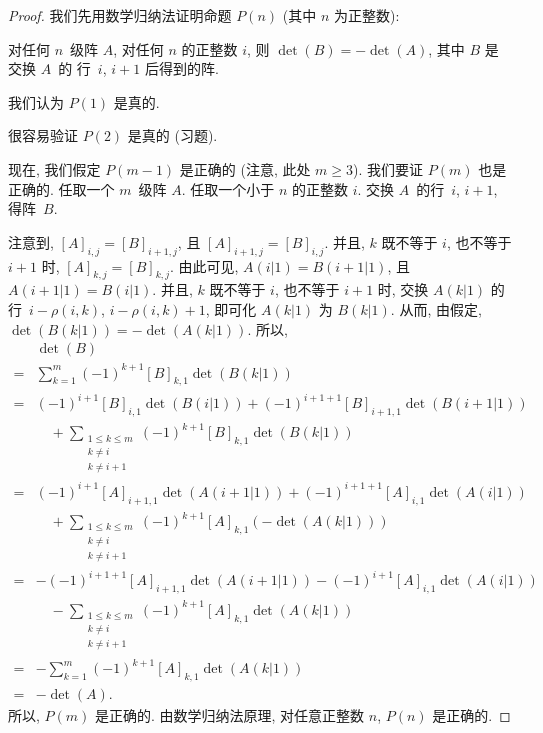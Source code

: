 \documentclass[%
    UTF8,%
    fontset=none,%
    punct=kaiming,%
    zihao=-4,%
    a4paper,%
    oneside,%
]{ctexbook}
\makeatletter
\let\emph\relax
\renewcommand*{\leq}{\leqslant}
\renewcommand*{\geq}{\geqslant}
\renewenvironment{quotation}
{\list{}{\listparindent 2\ccwd%
\itemindent\listparindent
\leftmargin\rightmargin
\parsep\z@ \@plus\p@}%
\item\relax}
{\endlist}
\makeatother
\begin{document}
\begin{proof}
    我们先用数学归纳法证明命题 \(P(n)\)
    (其中 \(n\) 为正整数):
    \begin{quotation}
        对任何 \(n\)~级阵 \(A\),
        对任何\emph{小于} \(n\) 的正整数 \(i\),
        则 \(\det {(B)} = -\det {(A)}\),
        其中 \(B\) 是交换 \(A\)~的%
        行~\(i\), \(i+1\) 后得到的阵.
    \end{quotation}

    我们认为 \(P(1)\) 是真的.

    很容易验证 \(P(2)\) 是真的 (习题).

    现在, 我们假定 \(P(m-1)\) 是正确的
    (注意, 此处 \(m \geq 3\)).
    我们要证 \(P(m)\) 也是正确的.
    任取一个 \(m\)~级阵 \(A\).
    任取一个小于 \(n\) 的正整数 \(i\).
    交换 \(A\)~的行~\(i\), \(i+1\),
    得阵~\(B\).

    注意到, \([A]_{i,j} = [B]_{i+1,j}\),
    且 \([A]_{i+1,j} = [B]_{i,j}\).
    并且, \(k\) 既不等于 \(i\), 也不等于 \(i+1\) 时,
    \([A]_{k,j} = [B]_{k,j}\).
    由此可见, \(A(i|1) = B({i+1}|1)\),
    且 \(A({i+1}|1) = B(i|1)\).
    并且, \(k\) 既不等于 \(i\), 也不等于 \(i+1\) 时,
    交换 \(A(k|1)\) 的%
    行~\(i - \rho(i,k)\), \(i - \rho(i,k) + 1\),
    即可化 \(A(k|1)\) 为 \(B(k|1)\).
    从而, 由假定,
    \(\det {(B(k|1))} = -\det {(A(k|1))}\).
    所以,
    \begin{align*}
             & \det {(B)}
        \\
        = {} &
        \sum_{k = 1}^{m}
        {(-1)^{k+1} [B]_{k,1} \det {(B(k|1))}}
        \\
        = {} &
        (-1)^{i+1} [B]_{i,1} \det {(B(i|1))}
        + (-1)^{i+1+1} [B]_{i+1,1} \det {(B({i+1}|1))}
        \\
             & \quad
        + \sum_{\substack{1 \leq k \leq m \\k \neq i\\k \neq i+1}}
        {(-1)^{k+1} [B]_{k,1} \det {(B(k|1))}}
        \\
        = {} &
        (-1)^{i+1} [A]_{i+1,1} \det {(A({i+1}|1))}
        + (-1)^{i+1+1} [A]_{i,1} \det {(A(i|1))}
        \\
             & \quad
        + \sum_{\substack{1 \leq k \leq m \\k \neq i\\k \neq i+1}}
        {(-1)^{k+1} [A]_{k,1} (-\det {(A(k|1))})}
        \\
        = {} &
        {-(-1)^{i+1+1}} [A]_{i+1,1} \det {(A({i+1}|1))}
        - (-1)^{i+1} [A]_{i,1} \det {(A(i|1))}
        \\
             & \quad
        - \sum_{\substack{1 \leq k \leq m \\k \neq i\\k \neq i+1}}
        {(-1)^{k+1} [A]_{k,1} \det {(A(k|1))}}
        \\
        = {} &
        {-\sum_{k = 1}^{m}
        {(-1)^{k+1} [A]_{k,1} \det {(A(k|1))}}}
        \\
        = {} &
        {-\det {(A)}}.
    \end{align*}
    所以, \(P(m)\) 是正确的.
    由数学归纳法原理,
    对任意正整数 \(n\), \(P(n)\) 是正确的.


\end{proof}
\end{document}
